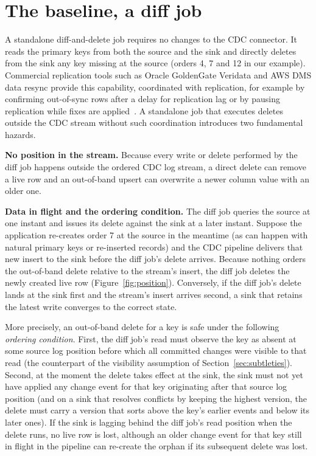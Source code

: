 \documentclass[sigconf,nonacm,10pt]{acmart}
\begin{document}
\section{The baseline, a diff job}\label{sec:diff}

A standalone diff-and-delete job requires no changes to the CDC connector. It
reads the primary keys from both the source and the sink and directly deletes
from the sink any key missing at the source (orders 4, 7 and 12 in our
example). Commercial replication tools such as Oracle GoldenGate Veridata and
AWS DMS data resync provide this capability, coordinated with replication, for
example by confirming out-of-sync rows after a delay for replication lag or by
pausing replication while fixes are applied~\cite{goldengate_veridata,aws_dms_resync}.
A standalone job that executes deletes outside the CDC stream without such
coordination introduces two fundamental hazards.

\textbf{No position in the stream.} Because every write or delete performed by
the diff job happens outside the ordered CDC log stream, a direct delete can
remove a live row and an out-of-band upsert can overwrite a newer column value
with an older one.

\textbf{Data in flight and the ordering condition.} The diff job queries the
source at one instant and issues its delete against the sink at a later instant.
Suppose the application re-creates order 7 at the source in the meantime (as can 
happen with natural primary keys or re-inserted records) and the CDC
pipeline delivers that new insert to the sink before the diff job's delete
arrives. Because nothing orders the out-of-band delete relative to the stream's
insert, the diff job deletes the newly created live row
(Figure~\ref{fig:position}). Conversely, if the diff job's delete lands at the
sink first and the stream's insert arrives second, a sink that retains the latest
write converges to the correct state.

More precisely, an out-of-band delete for a key is safe under the following
\emph{ordering condition}. First, the diff job's read must observe the key as
absent at some source log position before which all committed changes were
visible to that read (the counterpart of the visibility assumption of Section~\ref{sec:subtleties}).
Second, at the moment the delete takes effect at the sink, the sink must not yet
have applied any change event for that key originating after that source log
position (and on a sink that resolves conflicts by keeping the highest version,
the delete must carry a version that sorts above the key's earlier events and
below its later ones). If the sink is lagging
behind the diff job's read position when the delete runs, no live row is lost,
although an older change event for that key still in flight in the pipeline can
re-create the orphan if its subsequent delete was lost.
\end{document}

